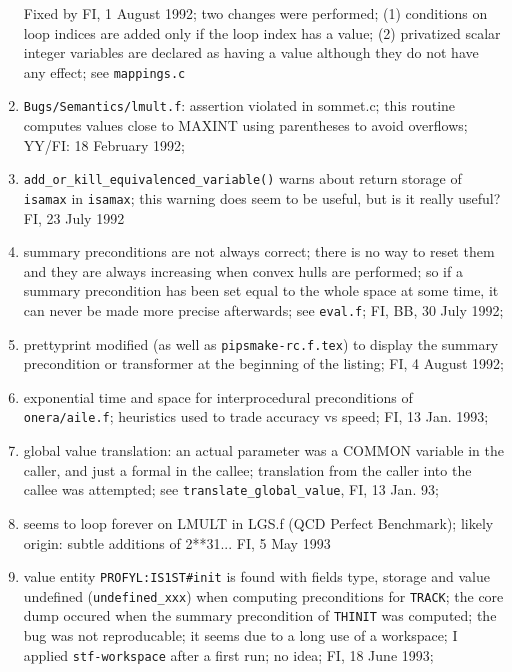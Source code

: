 \begin{enumerate}
        Fixed by FI, 1 August 1992; two changes were performed; (1) conditions
        on loop indices are added only if the loop index has a value;
        (2) privatized scalar integer variables are declared as having
        a value although they do not have any effect; see \verb+mappings.c+

  \item \verb+Bugs/Semantics/lmult.f+: assertion violated in sommet.c;
        this routine computes values close to MAXINT using parentheses
        to avoid overflows; YY/FI: 18 February 1992;

  \item \verb+add_or_kill_equivalenced_variable()+ warns about return
        storage of \verb+isamax+ in \verb+isamax+; this warning does
        seem to be useful, but is it really useful? FI, 23 July 1992

  \item summary preconditions are not always correct; there is no way
        to reset them and they are always increasing when convex hulls
        are performed; so if a summary precondition has been set equal
        to the whole space at some time, it can never be made more
        precise afterwards; see \verb+eval.f+; FI, BB, 30 July 1992;

  \item prettyprint modified (as well as \verb+pipsmake-rc.f.tex+) 
        to display the summary precondition or transformer
        at the beginning of the listing;
        FI, 4 August 1992;

  \item exponential time and space for interprocedural preconditions
        of \verb+onera/aile.f+; heuristics used to trade accuracy
        vs speed; FI, 13 Jan. 1993;

  \item global value translation: an actual parameter was a COMMON
        variable in the caller, and just a formal in the callee;
        translation from the caller into the callee was attempted;
        see \verb+translate_global_value+, FI, 13 Jan. 93;

  \item seems to loop forever on LMULT in LGS.f (QCD Perfect Benchmark);
        likely origin: subtle additions of 2**31... FI, 5 May 1993

  \item value entity \verb+PROFYL:IS1ST#init+ is found with fields type,
        storage and value undefined (\verb+undefined_xxx+) when
        computing preconditions for \verb+TRACK+; the core dump occured
        when the summary precondition of \verb+THINIT+ was computed;
        the bug was not reproducable; it seems due to a long use of
        a workspace; I applied \verb+stf-workspace+ after a first run;
        no idea; FI, 18 June 1993;


\end{enumerate}
